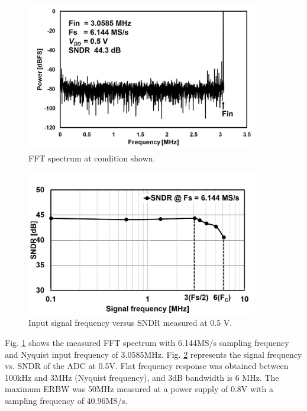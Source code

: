 \begin{figure}
\centering
  \includegraphics[width=0.9\textwidth]{figure/chap4/fig12.jpg}
  \caption{FFT spectrum at condition shown.}
  \label{fig-4-12}
\end{figure}
\begin{figure}
\centering
  \includegraphics[width=0.9\textwidth]{figure/chap4/fig13.jpg}
  \caption{Input signal frequency versus SNDR measured at 0.5 V.}
  \label{fig-4-13}
\end{figure}


Fig. \ref{fig-4-12} shows the measured FFT spectrum with 6.144MS/s sampling frequency and Nyquist input frequency of 3.0585MHz. Fig. \ref{fig-4-13} represents the signal frequency vs. SNDR of the ADC at 0.5V. Flat frequency response was obtained between 100kHz and 3MHz (Nyquist frequency), and 3dB bandwidth is  6 MHz. The maximum ERBW was 50MHz measured at a power supply of 0.8V with a sampling frequency of 40.96MS/s.

